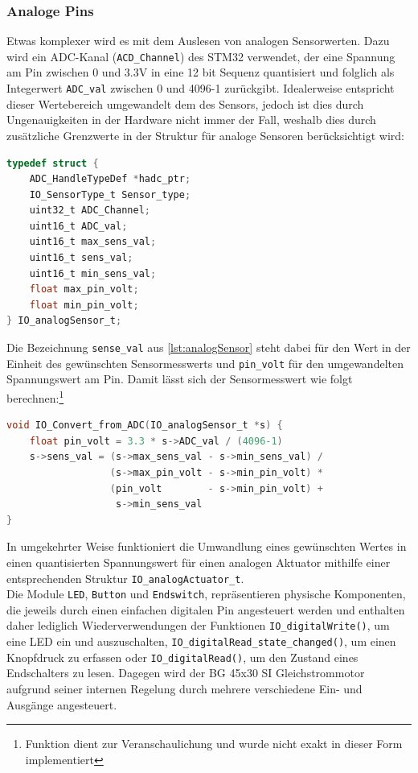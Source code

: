 \subsubsection{Analoge Pins}
Etwas komplexer wird es mit dem Auslesen von analogen Sensorwerten. Dazu wird ein ADC-Kanal (\verb|ACD_Channel|) des STM32 verwendet, der eine Spannung am Pin zwischen 0 und 3.3V in eine 12 bit Sequenz quantisiert und folglich als Integerwert \verb|ADC_val| zwischen 0 und 4096-1 zurückgibt. Idealerweise entspricht dieser Wertebereich umgewandelt dem des Sensors, jedoch ist dies durch Ungenauigkeiten in der Hardware nicht immer der Fall, weshalb dies durch zusätzliche Grenzwerte in der Struktur für analoge Sensoren berücksichtigt wird:
\begin{lstlisting}[language=C, caption={Struktur für analoge Sensoren}, label={lst:analogSensor}]
typedef struct {
	ADC_HandleTypeDef *hadc_ptr;
	IO_SensorType_t Sensor_type;
	uint32_t ADC_Channel;
	uint16_t ADC_val;
	uint16_t max_sens_val;
	uint16_t sens_val;
	uint16_t min_sens_val;
	float max_pin_volt;
	float min_pin_volt;
} IO_analogSensor_t;
\end{lstlisting}
Die Bezeichnung \verb|sense_val| aus \autoref{lst:analogSensor} steht dabei für den Wert in der Einheit des gewünschten Sensormesswerts und \verb|pin_volt| für den umgewandelten Spannungswert am Pin. Damit lässt sich der Sensormesswert wie folgt berechnen:\footnote{Funktion dient zur Veranschaulichung und wurde nicht exakt in dieser Form implementiert}
\begin{lstlisting}[language=C, caption={Konvertierung des rohen Analogwerts}, label={analogRead}]
void IO_Convert_from_ADC(IO_analogSensor_t *s) {
	float pin_volt = 3.3 * s->ADC_val / (4096-1)
	s->sens_val = (s->max_sens_val - s->min_sens_val) /
	              (s->max_pin_volt - s->min_pin_volt) *
	              (pin_volt        - s->min_pin_volt) +
	               s->min_sens_val
}
\end{lstlisting}
In umgekehrter Weise funktioniert die Umwandlung eines gewünschten Wertes in einen quantisierten Spannungswert für einen analogen Aktuator mithilfe einer entsprechenden Struktur \verb|IO_analogActuator_t|. \\

\noindent
Die Module \verb|LED|, \verb|Button| und \verb|Endswitch|, repräsentieren physische Komponenten, die jeweils durch einen einfachen digitalen Pin angesteuert werden und enthalten daher lediglich Wiederverwendungen der Funktionen \verb|IO_digitalWrite()|, um eine LED ein und auszuschalten, \verb|IO_digitalRead_state_changed()|, um einen Knopfdruck zu erfassen oder \verb|IO_digitalRead()|, um den Zustand eines Endschalters zu lesen. Dagegen wird der BG 45x30 SI Gleichstrommotor aufgrund seiner internen Regelung durch mehrere verschiedene Ein- und Ausgänge angesteuert.
